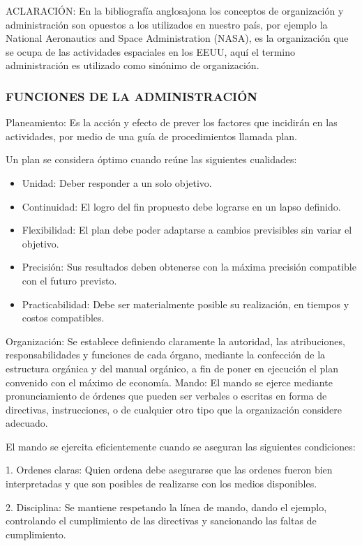 
ACLARACIÓN: En la bibliografía anglosajona los conceptos de organización y administración son opuestos a los utilizados en nuestro país, por ejemplo la National Aeronautics and Space Administration (NASA), es la organización que se ocupa de las actividades espaciales en los EEUU, aquí el termino administración es utilizado como sinónimo de organización.

\subsubsection*{FUNCIONES DE LA ADMINISTRACIÓN}
Planeamiento: Es la acción y efecto de prever los factores que incidirán en las actividades, por medio de una guía de procedimientos llamada plan.

Un plan se considera óptimo cuando reúne las siguientes cualidades:

\begin{itemize}
  \item Unidad: Deber responder a un solo objetivo.
  \item Continuidad: El logro del fin propuesto debe lograrse en un lapso definido.
  \item Flexibilidad: El plan debe poder adaptarse a cambios previsibles sin variar el objetivo.
  \item Precisión: Sus resultados deben obtenerse con la máxima precisión compatible con el futuro previsto.
  \item Practicabilidad: Debe ser materialmente posible su realización, en tiempos y costos compatibles.
\end{itemize}
Organización: Se establece definiendo claramente la autoridad, las atribuciones, responsabilidades y funciones de cada órgano, mediante la confección de la estructura orgánica y del manual orgánico, a fin de poner en ejecución el plan convenido con el máximo de economía. Mando: El mando se ejerce mediante pronunciamiento de órdenes que pueden ser verbales o escritas en forma de directivas, instrucciones, o de cualquier otro tipo que la organización considere adecuado.

El mando se ejercita eficientemente cuando se aseguran las siguientes condiciones:

1. Ordenes claras: Quien ordena debe asegurarse que las ordenes fueron bien interpretadas y que son posibles de realizarse con los medios disponibles.

2. Disciplina: Se mantiene respetando la línea de mando, dando el ejemplo, controlando el cumplimiento de las directivas y sancionando las faltas de cumplimiento.

